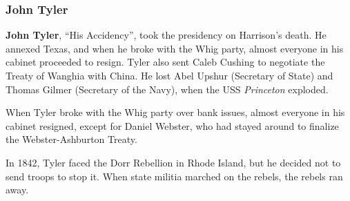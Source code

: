 \subsubsection*{John Tyler}

\textbf{John Tyler}, ``His Accidency'', took the presidency on Harrison's death.
He annexed Texas, and when he broke with the Whig party, almost everyone in his cabinet proceeded to resign.
Tyler also sent Caleb Cushing to negotiate the Treaty of Wanghia with China.
He lost Abel Upshur (Secretary of State) and Thomas Gilmer (Secretary of the Navy),
when the USS \textit{Princeton} exploded.

When Tyler broke with the Whig party over bank issues, almost everyone in his cabinet resigned,
except for Daniel Webster, who had stayed around to finalize the Webster-Ashburton Treaty.

In 1842, Tyler faced the Dorr Rebellion in Rhode Island, but he decided not to send troops to stop it.
When state militia marched on the rebels, the rebels ran away.
